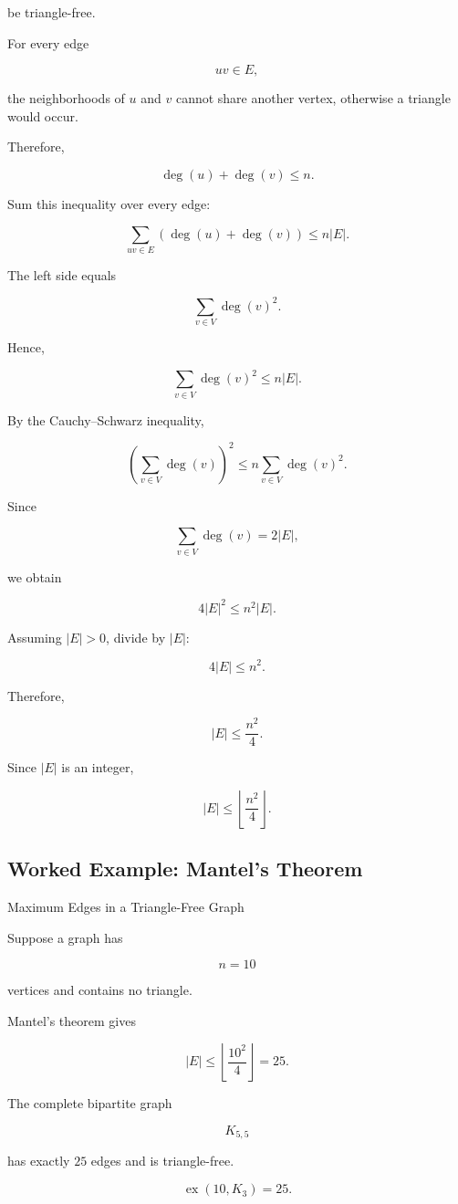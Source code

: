 be triangle-free.

For every edge

\[
uv\in E,
\]

the neighborhoods of \(u\) and \(v\) cannot share another vertex,
otherwise a triangle would occur.

Therefore,

\[
\deg(u)+\deg(v)\leq n.
\]

Sum this inequality over every edge:

\[
\sum_{uv\in E}
\left(
\deg(u)+\deg(v)
\right)
\leq
n|E|.
\]

The left side equals

\[
\sum_{v\in V}\deg(v)^2.
\]

Hence,

\[
\sum_{v\in V}\deg(v)^2
\leq
n|E|.
\]

By the Cauchy--Schwarz inequality,

\[
\left(
\sum_{v\in V}\deg(v)
\right)^2
\leq
n
\sum_{v\in V}\deg(v)^2.
\]

Since

\[
\sum_{v\in V}\deg(v)=2|E|,
\]

we obtain

\[
4|E|^2
\leq
n^2|E|.
\]

Assuming \(|E|>0\), divide by \(|E|\):

\[
4|E|\leq n^2.
\]

Therefore,

\[
\boxed{
|E|\leq\frac{n^2}{4}.
}
\]

Since \(|E|\) is an integer,

\[
\boxed{
|E|
\leq
\left\lfloor\frac{n^2}{4}\right\rfloor.
}
\]

\subsection{Worked Example: Mantel's Theorem}
\label{subsec:worked-mantel}

\begin{workedexamplebox}{Maximum Edges in a Triangle-Free Graph}

Suppose a graph has

\[
n=10
\]

vertices and contains no triangle.

Mantel's theorem gives

\[
|E|
\leq
\left\lfloor
\frac{10^2}{4}
\right\rfloor
=
25.
\]

The complete bipartite graph

\[
K_{5,5}
\]

has exactly \(25\) edges and is triangle-free.

\begin{answerbox}
\[
\boxed{
\operatorname{ex}(10,K_3)=25.
}
\]
\end{answerbox}

\end{workedexamplebox}

